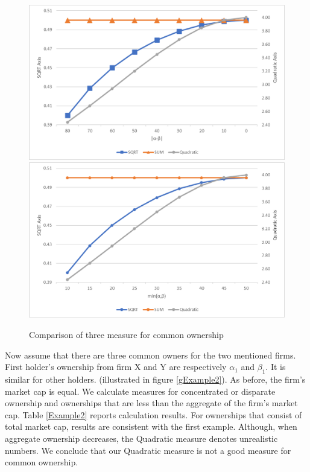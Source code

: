 \documentclass[12pt, a4paper]{article}
\begin{document}
\begin{figure}[htbp]
	\caption{ Comparison of three measure for common ownership}
	\label{example1Results}
	\includegraphics[width=0.47\linewidth]{1.png}
	\includegraphics[width=0.47\linewidth]{2.png}
	
\end{figure}


Now assume that there are three common owners for the two mentioned firms. First holder's ownership from firm X and Y are respectively $\alpha_1$ and $\beta_1$. It is similar for other holders. (illustrated in figure \ref{gExample2}). As before, the firm's market cap is equal. We calculate measures for concentrated or disparate ownership and ownerships that are less than the aggregate of the firm's market cap. Table \ref{Example2} reports calculation results. For ownerships that consist of total market cap,  results are consistent with the first example. Although, when aggregate ownership decreases, the Quadratic measure denotes unrealistic numbers. We conclude that our Quadratic measure is not a good measure for common ownership.
\end{document}
